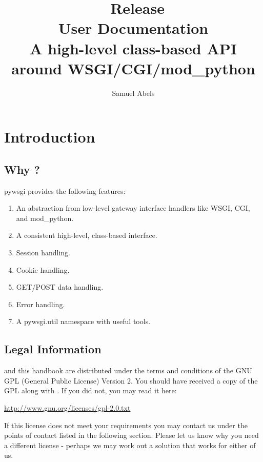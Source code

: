 \title{\productname\ Release \productversion\\
User Documentation\\
\vspace{5 mm}
\large A high-level class-based API around WSGI/CGI/mod\_python}
\author{Samuel Abels}


\maketitle
\tableofcontents

\newpage
\section{Introduction}
\subsection{Why \productname?}

pywsgi provides the following features:

\begin{enumerate}
\item An abstraction from low-level gateway interface handlers like WSGI,
CGI, and mod\_python.
\item A consistent high-level, class-based interface.
\item Session handling.
\item Cookie handling.
\item GET/POST data handling.
\item Error handling.
\item A pywsgi.util namespace with useful tools.
\end{enumerate}


\subsection{Legal Information}

\product and this handbook are distributed under the terms and conditions 
of the GNU GPL (General Public License) Version 2. You should have received 
a copy of the GPL along with \product. If you did not, you may read it here:

\vspace{1em}
\url{http://www.gnu.org/licenses/gpl-2.0.txt}
\vspace{1em}

If this license does not meet your requirements you may contact us under 
the points of contact listed in the following section. Please let us know 
why you need a different license - perhaps we may work out a solution 
that works for either of us.


